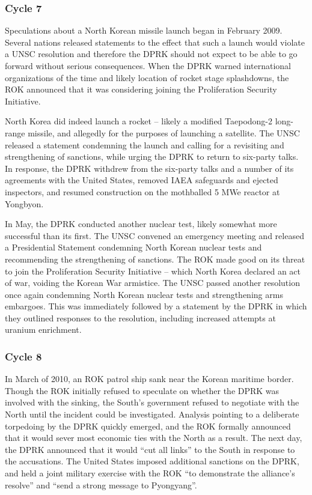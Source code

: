 \documentclass{article}
\begin{document}
\subsubsection{Cycle 7}

Speculations about a North Korean missile launch began in February 2009. Several nations released statements to the effect that such a launch would violate a UNSC resolution and therefore the DPRK should not expect to be able to go forward without serious consequences\cite{davenport}. When the DPRK warned international organizations of the time and likely location of rocket stage splashdowns, the ROK announced that it was considering joining the Proliferation Security Initiative\cite{davenport}.

North Korea did indeed launch a rocket – likely a modified Taepodong-2 long-range missile, and allegedly for the purposes of launching a satellite\cite{davenport}. The UNSC released a statement condemning the launch and calling for a revisiting and strengthening of sanctions, while urging the DPRK to return to six-party talks\cite{unsc09}. In response, the DPRK withdrew from the six-party talks and a number of its agreements with the United States\cite{niksch}, removed IAEA safeguards and ejected inspectors\cite{iaea09}, and resumed construction on the mothballed 5 MWe reactor at Yongbyon\cite{nti15}.

In May, the DPRK conducted another nuclear test, likely somewhat more successful than its first\cite{nti15}. The UNSC convened an emergency meeting and released a Presidential Statement condemning North Korean nuclear tests and recommending the strengthening of sanctions\cite{unsc09p}. The ROK made good on its threat to join the Proliferation Security Initiative – which North Korea declared an act of war, voiding the Korean War armistice\cite{glionna}. The UNSC passed another resolution once again condemning North Korean nuclear tests and strengthening arms embargoes\cite{unsc09j}. This was immediately followed by a statement by the DPRK in which they outlined responses to the resolution, including increased attempts at uranium enrichment\cite{nti15}.

\subsubsection{Cycle 8}

In March of 2010, an ROK patrol ship sank near the Korean maritime border\cite{branigan}. Though the ROK initially refused to speculate on whether the DPRK was involved with the sinking\cite{branigan}, the South’s government refused to negotiate with the North until the incident could be investigated\cite{davenport}. Analysis pointing to a deliberate torpedoing by the DPRK quickly emerged\cite{reuters}, and the ROK formally announced that it would sever most economic ties with the North as a result. The next day, the DPRK announced that it would “cut all links” to the South in response to the accusations\cite{davenport}. The United States imposed additional sanctions on the DPRK, and held a joint military exercise with the ROK “to demonstrate the alliance’s resolve” and “send a strong message to Pyongyang”\cite{starr}.
\end{document}

